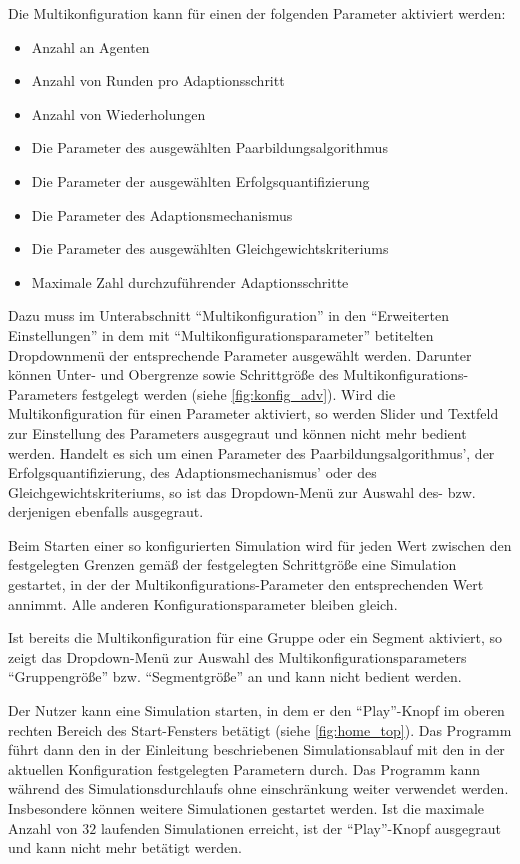 \documentclass[parskip=full,11pt]{scrartcl}
\def\adapt{Adaptionsschritt}
\begin{document}
Die Multikonfiguration kann für einen der folgenden Parameter aktiviert werden:
\begin{itemize} \itemsep -10pt
\item Anzahl an Agenten
\item Anzahl von Runden pro \adapt
\item Anzahl von Wiederholungen
\item Die Parameter des ausgewählten Paarbildungsalgorithmus
\item Die Parameter der ausgewählten Erfolgsquantifizierung
\item Die Parameter des Adaptionsmechanismus
\item Die Parameter des ausgewählten Gleichgewichtskriteriums
\item Maximale Zahl durchzuführender Adaptionsschritte
\end{itemize}
Dazu muss im Unterabschnitt \enquote{Multikonfiguration} in den \enquote{Erweiterten Einstellungen} in dem mit \enquote{Multikonfigurationsparameter} betitelten Dropdownmenü der entsprechende Parameter ausgewählt werden. Darunter können Unter- und Obergrenze sowie Schrittgröße des Multikonfigurations-Parameters festgelegt werden (siehe \cref{fig:konfig_adv}). Wird die Multikonfiguration für einen Parameter aktiviert, so werden Slider und Textfeld zur Einstellung des Parameters ausgegraut und können nicht mehr bedient werden. Handelt es sich um einen Parameter des Paarbildungsalgorithmus', der Erfolgsquantifizierung, des Adaptionsmechanismus' oder des Gleichgewichtskriteriums, so ist das Dropdown-Menü zur Auswahl des- bzw. derjenigen ebenfalls ausgegraut.

Beim Starten einer so konfigurierten Simulation wird für jeden Wert zwischen den festgelegten Grenzen gemäß der festgelegten Schrittgröße eine Simulation gestartet, in der der Multikonfigurations-Parameter den entsprechenden Wert annimmt. Alle anderen Konfigurationsparameter bleiben gleich.

Ist bereits die Multikonfiguration für eine Gruppe oder ein Segment aktiviert, so zeigt das Dropdown-Menü zur Auswahl des Multikonfigurationsparameters \enquote{Gruppengröße} bzw. \enquote{Segmentgröße} an und kann nicht bedient werden.

Der \Gls{Nutzer} kann eine Simulation starten, in dem er den \enquote{Play}-Knopf im oberen rechten Bereich des Start-Fensters betätigt (siehe \cref{fig:home_top}). Das Programm führt dann den in der Einleitung beschriebenen Simulationsablauf mit den in der aktuellen \Gls{Konfiguration} festgelegten Parametern durch. Das Programm kann während des Simulationsdurchlaufs ohne einschränkung weiter verwendet werden. Insbesondere können weitere Simulationen gestartet werden. Ist die maximale Anzahl von \(32\) laufenden Simulationen erreicht, ist der \enquote{Play}-Knopf ausgegraut und kann nicht mehr betätigt werden.
\end{document}
